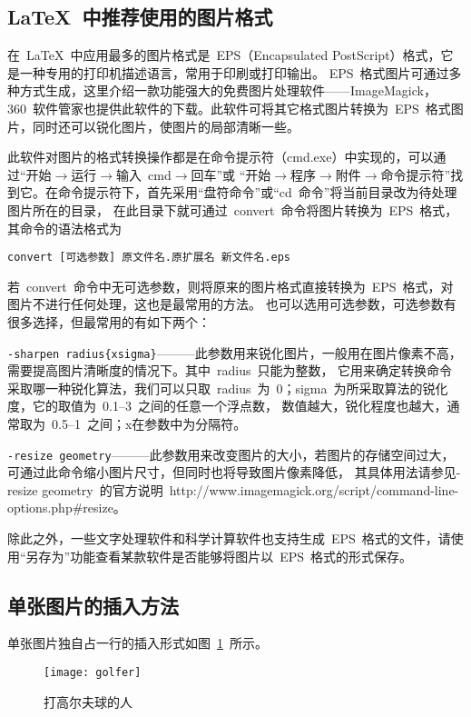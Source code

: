 \subsection{\LaTeX~中推荐使用的图片格式}
在~\LaTeX~中应用最多的图片格式是~EPS（Encapsulated PostScript）格式，它是一种专用的打印机描述语言，常用于印刷或打印输出。
EPS~格式图片可通过多种方式生成，这里介绍一款功能强大的免费图片处理软件------ImageMagick，
360~软件管家也提供此软件的下载。此软件可将其它格式图片转换为~EPS~格式图片，同时还可以锐化图片，使图片的局部清晰一些。

此软件对图片的格式转换操作都是在命令提示符（cmd.exe）中实现的，可以通过“开始$\to$运行$\to$输入~cmd$\to$回车”或
“开始$\to$程序$\to$附件$\to$命令提示符”找到它。在命令提示符下，首先采用“盘符命令”或“cd~命令”将当前目录改为待处理图片所在的目录，
在此目录下就可通过~convert~命令将图片转换为~EPS~格式，其命令的语法格式为

\noindent\verb|convert [可选参数] 原文件名.原扩展名 新文件名.eps|

\noindent 若~convert~命令中无可选参数，则将原来的图片格式直接转换为~EPS~格式，对图片不进行任何处理，这也是最常用的方法。
也可以选用可选参数，可选参数有很多选择，但最常用的有如下两个：

\verb|-sharpen radius{xsigma}|———此参数用来锐化图片，一般用在图片像素不高，需要提高图片清晰度的情况下。其中~radius~只能为整数，
它用来确定转换命令采取哪一种锐化算法，我们可以只取~radius~为~0；sigma~为所采取算法的锐化度，它的取值为~0.1--3~之间的任意一个浮点数，
数值越大，锐化程度也越大，通常取为~0.5--1~之间；x在参数中为分隔符。

\verb|-resize geometry|———此参数用来改变图片的大小，若图片的存储空间过大，可通过此命令缩小图片尺寸，但同时也将导致图片像素降低，
其具体用法请参见-resize geometry~的官方说明~http://www.imagemagick.org/script/command-line-options.php\#resize。

除此之外，一些文字处理软件和科学计算软件也支持生成~EPS~格式的文件，请使用“另存为”功能查看某款软件是否能够将图片以~EPS~格式的形式保存。

\subsection{单张图片的插入方法}
单张图片独自占一行的插入形式如图~\ref{golfer1}~所示。
\begin{figure}[htbp]
\centering
\texttt{[image: golfer]}
\caption{打高尔夫球的人}\label{golfer1}
\vspace{-1em}
\end{figure}

